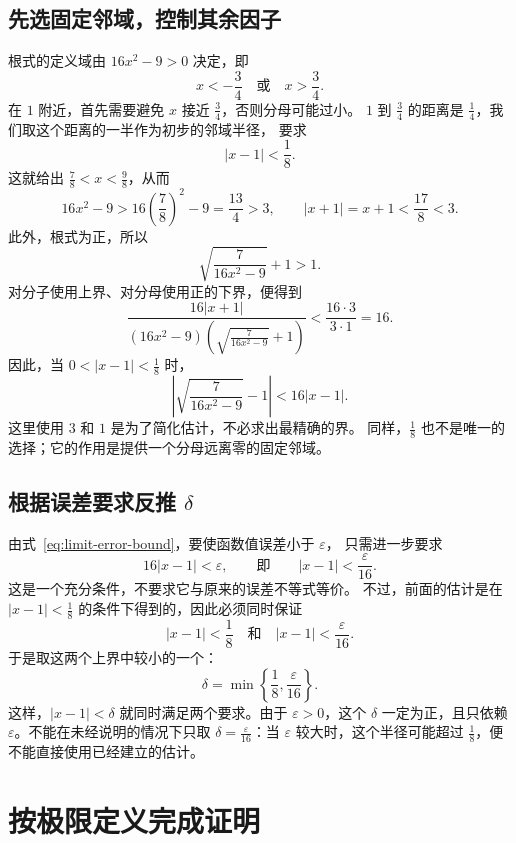 \documentclass{ctexart}
\begin{document}
\subsection{先选固定邻域，控制其余因子}

根式的定义域由 $16x^2-9>0$ 决定，即
\[
  x<-\frac34\quad\text{或}\quad x>\frac34.
\]
在 $1$ 附近，首先需要避免 $x$ 接近 $\frac34$，否则分母可能过小。
$1$ 到 $\frac34$ 的距离是 $\frac14$，我们取这个距离的一半作为初步的邻域半径，
要求
\[
  |x-1|<\frac18.
\]
这就给出 $\frac78<x<\frac98$，从而
\[
  16x^2-9>16\left(\frac78\right)^2-9=\frac{13}{4}>3,
  \qquad
  |x+1|=x+1<\frac{17}{8}<3.
\]
此外，根式为正，所以
\[
  \sqrt{\frac{7}{16x^2-9}}+1>1.
\]
对分子使用上界、对分母使用正的下界，便得到
\[
  \frac{16|x+1|}
       {(16x^2-9)\left(\sqrt{\frac{7}{16x^2-9}}+1\right)}
  <\frac{16\cdot3}{3\cdot1}=16.
\]
因此，当 $0<|x-1|<\frac18$ 时，
\begin{equation}\label{eq:limit-error-bound}
  \left|\sqrt{\frac{7}{16x^2-9}}-1\right|<16|x-1|.
\end{equation}
这里使用 $3$ 和 $1$ 是为了简化估计，不必求出最精确的界。
同样，$\frac18$ 也不是唯一的选择；它的作用是提供一个分母远离零的固定邻域。

\subsection{根据误差要求反推 \texorpdfstring{$\delta$}{delta}}

由式~\eqref{eq:limit-error-bound}，要使函数值误差小于 $\varepsilon$，
只需进一步要求
\[
  16|x-1|<\varepsilon,
  \qquad\text{即}\qquad
  |x-1|<\frac{\varepsilon}{16}.
\]
这是一个充分条件，不要求它与原来的误差不等式等价。
不过，前面的估计是在 $|x-1|<\frac18$ 的条件下得到的，因此必须同时保证
\[
  |x-1|<\frac18
  \quad\text{和}\quad
  |x-1|<\frac{\varepsilon}{16}.
\]
于是取这两个上界中较小的一个：
\[
  \delta=\min\left\{\frac18,\frac{\varepsilon}{16}\right\}.
\]
这样，$|x-1|<\delta$ 就同时满足两个要求。由于 $\varepsilon>0$，这个 $\delta$
一定为正，且只依赖 $\varepsilon$。不能在未经说明的情况下只取
$\delta=\frac{\varepsilon}{16}$：当 $\varepsilon$ 较大时，这个半径可能超过
$\frac18$，便不能直接使用已经建立的估计。

\section{按极限定义完成证明}
\end{document}
